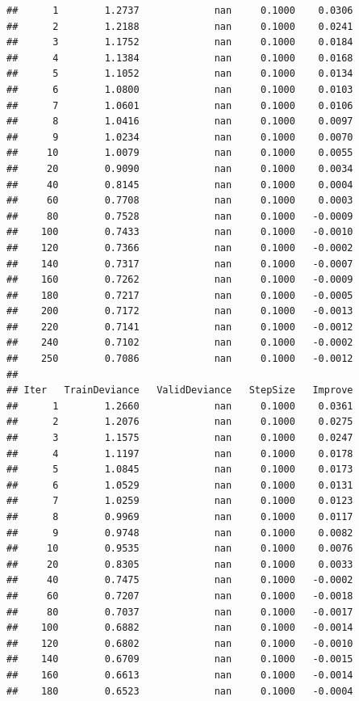 \documentclass[
]{book}
\begin{document}
\begin{verbatim}
##      1        1.2737             nan     0.1000    0.0306
##      2        1.2188             nan     0.1000    0.0241
##      3        1.1752             nan     0.1000    0.0184
##      4        1.1384             nan     0.1000    0.0168
##      5        1.1052             nan     0.1000    0.0134
##      6        1.0800             nan     0.1000    0.0103
##      7        1.0601             nan     0.1000    0.0106
##      8        1.0416             nan     0.1000    0.0097
##      9        1.0234             nan     0.1000    0.0070
##     10        1.0079             nan     0.1000    0.0055
##     20        0.9090             nan     0.1000    0.0034
##     40        0.8145             nan     0.1000    0.0004
##     60        0.7708             nan     0.1000    0.0003
##     80        0.7528             nan     0.1000   -0.0009
##    100        0.7433             nan     0.1000   -0.0010
##    120        0.7366             nan     0.1000   -0.0002
##    140        0.7317             nan     0.1000   -0.0007
##    160        0.7262             nan     0.1000   -0.0009
##    180        0.7217             nan     0.1000   -0.0005
##    200        0.7172             nan     0.1000   -0.0013
##    220        0.7141             nan     0.1000   -0.0012
##    240        0.7102             nan     0.1000   -0.0002
##    250        0.7086             nan     0.1000   -0.0012
## 
## Iter   TrainDeviance   ValidDeviance   StepSize   Improve
##      1        1.2660             nan     0.1000    0.0361
##      2        1.2076             nan     0.1000    0.0275
##      3        1.1575             nan     0.1000    0.0247
##      4        1.1197             nan     0.1000    0.0178
##      5        1.0845             nan     0.1000    0.0173
##      6        1.0529             nan     0.1000    0.0131
##      7        1.0259             nan     0.1000    0.0123
##      8        0.9969             nan     0.1000    0.0117
##      9        0.9748             nan     0.1000    0.0082
##     10        0.9535             nan     0.1000    0.0076
##     20        0.8305             nan     0.1000    0.0033
##     40        0.7475             nan     0.1000   -0.0002
##     60        0.7207             nan     0.1000   -0.0018
##     80        0.7037             nan     0.1000   -0.0017
##    100        0.6882             nan     0.1000   -0.0014
##    120        0.6802             nan     0.1000   -0.0010
##    140        0.6709             nan     0.1000   -0.0015
##    160        0.6613             nan     0.1000   -0.0014
##    180        0.6523             nan     0.1000   -0.0004

\end{verbatim}
\end{document}
